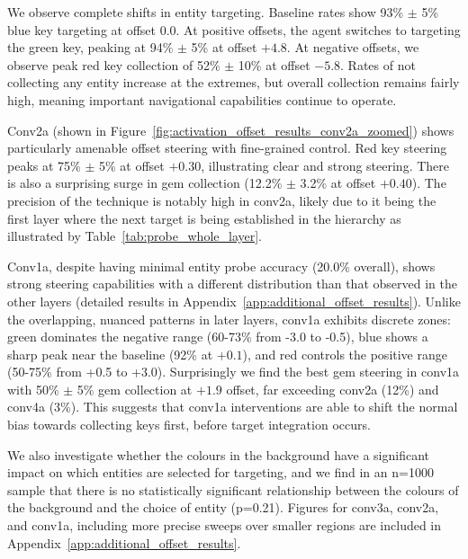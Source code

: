 We observe complete shifts in entity targeting. Baseline rates show 93\% $\pm$ 5\% blue key targeting at offset 0.0. At positive offsets, the agent switches to targeting the green key, peaking at 94\% $\pm$ 5\% at offset $+4.8$. At negative offsets, we observe peak red key collection of 52\% $\pm$ 10\% at offset $-5.8$. Rates of not collecting any entity increase at the extremes, but overall collection remains fairly high, meaning important navigational capabilities continue to operate.

Conv2a (shown in Figure~\ref{fig:activation_offset_results_conv2a_zoomed}) shows particularly amenable offset steering with fine-grained control. Red key steering peaks at 75\% $\pm$ 5\% at offset $+0.30$, illustrating clear and strong steering. There is also a surprising surge in gem collection (12.2\% $\pm$ 3.2\% at offset $+0.40$). The precision of the technique is notably high in conv2a, likely due to it being the first layer where the next target is being established in the hierarchy as illustrated by Table~\ref{tab:probe_whole_layer}.

Conv1a, despite having minimal entity probe accuracy (20.0\% overall), shows strong steering capabilities with a different distribution than that observed in the other layers (detailed results in Appendix~\ref{app:additional_offset_results}). Unlike the overlapping, nuanced patterns in later layers, conv1a exhibits discrete zones: green dominates the negative range (60-73\% from -3.0 to -0.5), blue shows a sharp peak near the baseline (92\% at $+0.1$), and red controls the positive range (50-75\% from +0.5 to +3.0). Surprisingly we find the best gem steering in conv1a with 50\% $\pm$ 5\% gem collection at $+1.9$ offset, far exceeding conv2a (12\%) and conv4a (3\%). This suggests that conv1a interventions are able to shift the normal bias towards collecting keys first, before target integration occurs. 

We also investigate whether the colours in the background have a significant impact on which entities are selected for targeting, and we find in an n=1000 sample that there is no statistically significant relationship between the colours of the background and the choice of entity (p=0.21). Figures for conv3a, conv2a, and conv1a, including more precise sweeps over smaller regions are included in Appendix~\ref{app:additional_offset_results}.


